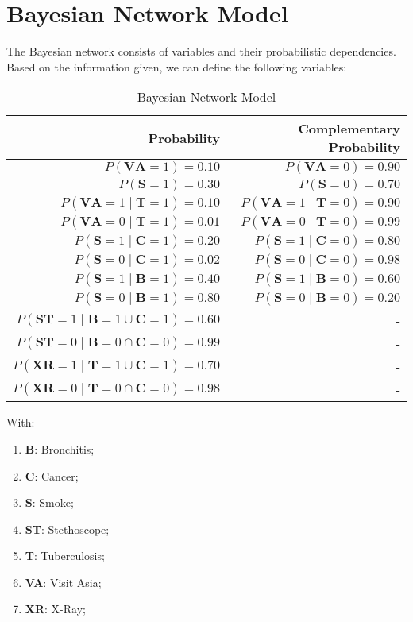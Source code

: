 \documentclass[../CSC_5RO11_TA_TP6.tex]{subfiles}
\begin{document}
\section{Bayesian Network Model}
\noindent The Bayesian network consists of variables and their probabilistic dependencies. Based on the information given, we can define the following variables:
\begin{table}[H]
    \centering
    \begin{tabular}{rr}
        Probability & Complementary Probability\\
        \hline
        $P(\mathbf{VA} = 1) = 0.10$ & $P(\mathbf{VA} = 0) = 0.90$\\
        $P(\mathbf{S} = 1) = 0.30$ & $P(\mathbf{S} = 0) = 0.70$\\
        $P(\mathbf{VA} = 1\;|\;\mathbf{T} = 1) = 0.10$ & $P(\mathbf{VA} = 1\;|\;\mathbf{T} = 0) = 0.90
        $\\
        $P(\mathbf{VA} = 0\;|\;\mathbf{T} = 1) = 0.01$ & $P(\mathbf{VA} = 0\;|\;\mathbf{T} = 0) = 0.99$\\
        $P(\mathbf{S} = 1\;|\;\mathbf{C} = 1) = 0.20$ & $P(\mathbf{S} = 1\;|\;\mathbf{C} = 0) = 0.80$\\
        $P(\mathbf{S} = 0\;|\;\mathbf{C} = 1) = 0.02$ & $P(\mathbf{S} = 0\;|\;\mathbf{C} = 0) = 0.98$\\
        $P(\mathbf{S} = 1\;|\;\mathbf{B} = 1) = 0.40$ & $P(\mathbf{S} = 1\;|\;\mathbf{B} = 0) = 0.60$\\
        $P(\mathbf{S} = 0\;|\;\mathbf{B} = 1) = 0.80$ & $P(\mathbf{S} = 0\;|\;\mathbf{B} = 0) = 0.20$\\
        $P(\mathbf{ST} = 1\;|\;\mathbf{B} = 1 \cup \mathbf{C} = 1) = 0.60$ & -\\
        $P(\mathbf{ST} = 0\;|\;\mathbf{B} = 0 \cap \mathbf{C} = 0) = 0.99$ & -\\
        $P(\mathbf{XR} = 1\;|\;\mathbf{T} = 1 \cup \mathbf{C} = 1) = 0.70$ & -\\
        $P(\mathbf{XR} = 0\;|\;\mathbf{T} = 0 \cap \mathbf{C} = 0) = 0.98$ & -\\
        \hline
    \end{tabular}
    \caption{Bayesian Network Model}
    \label{}
\end{table}
\noindent With:
\begin{enumerate}[noitemsep]
    \item \textbf{B}: Bronchitis;
    \item \textbf{C}: Cancer;
    \item \textbf{S}: Smoke;
    \item \textbf{ST}: Stethoscope;
    \item \textbf{T}: Tuberculosis;
    \item \textbf{VA}: Visit Asia;
    \item \textbf{XR}: X-Ray;
\end{enumerate}
\end{document}
